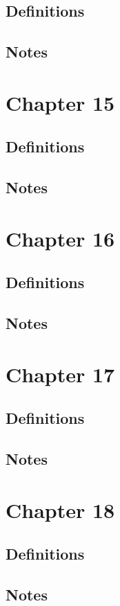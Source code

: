 \documentclass[12pt]{article}
\begin{document}
\subsection{Definitions}
\subsection{Notes}

\section{Chapter 15}
\subsection{Definitions}
\subsection{Notes}

\section{Chapter 16}
\subsection{Definitions}
\subsection{Notes}

\section{Chapter 17}
\subsection{Definitions}
\subsection{Notes}

\section{Chapter 18}
\subsection{Definitions}
\subsection{Notes}
\end{document}
